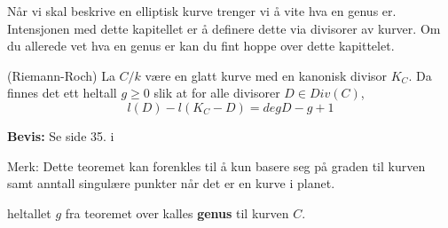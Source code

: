 Når vi skal beskrive en elliptisk kurve trenger vi å vite hva en genus er. Intensjonen med dette kapitellet er å definere dette via divisorer av kurver. Om du allerede vet hva en genus er kan du fint hoppe over dette kapittelet.



\begin{teorem}(Riemann-Roch)
La $C/k$ være en glatt kurve med en kanonisk divisor $K_C$. Da finnes det ett heltall $g \geq 0$ slik at for alle divisorer $D \in Div(C)$, $$l(D) - l(K_C - D) = deg D - g + 1$$

\textbf{Bevis:} Se side 35. i \cite{silverman}
\end{teorem}
Merk: Dette teoremet kan forenkles til å kun basere seg på graden til kurven samt anntall singulære punkter når det er en kurve i planet.
\begin{definisjon}
heltallet $g$ fra teoremet over kalles \textbf{genus} til kurven $C$.
\end{definisjon}